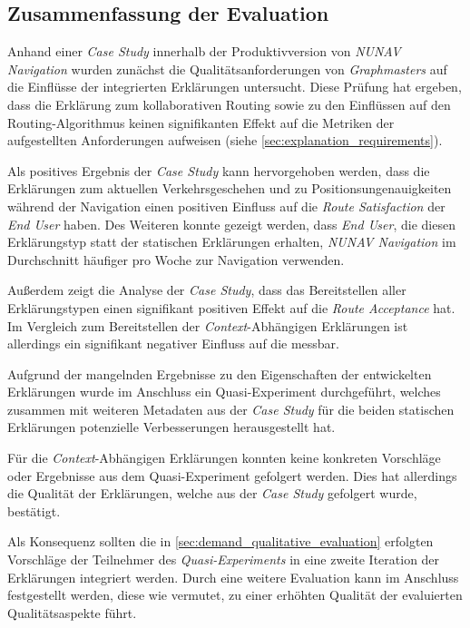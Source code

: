 \subsection{Zusammenfassung der Evaluation}

Anhand einer \textit{Case Study} innerhalb der Produktivversion von \textit{NUNAV Navigation} wurden zunächst die Qualitätsanforderungen von \textit{Graphmasters} auf die Einflüsse der integrierten Erklärungen untersucht. Diese Prüfung hat ergeben, dass die Erklärung zum kollaborativen Routing sowie zu den Einflüssen auf den Routing-Algorithmus keinen signifikanten Effekt auf die Metriken der aufgestellten Anforderungen aufweisen (siehe \autoref{sec:explanation_requirements}).

Als positives Ergebnis der \textit{Case Study} kann hervorgehoben werden, dass die Erklärungen zum aktuellen Verkehrsgeschehen und zu Positionsungenauigkeiten während der Navigation einen positiven Einfluss auf die \textit{Route Satisfaction} der \textit{End User} haben. Des Weiteren konnte gezeigt werden, dass \textit{End User}, die diesen Erklärungstyp statt der statischen Erklärungen erhalten, \textit{NUNAV Navigation} im Durchschnitt häufiger pro Woche zur Navigation verwenden.

Außerdem zeigt die Analyse der \textit{Case Study}, dass das Bereitstellen aller Erklärungstypen einen signifikant positiven Effekt auf die \textit{Route Acceptance} hat. Im Vergleich zum Bereitstellen der \textit{Context}-Abhängigen Erklärungen ist allerdings ein signifikant negativer Einfluss auf die  messbar.

Aufgrund der mangelnden Ergebnisse zu den Eigenschaften der entwickelten Erklärungen wurde im Anschluss ein Quasi-Experiment durchgeführt, welches zusammen mit weiteren Metadaten aus der \textit{Case Study} für die beiden statischen Erklärungen potenzielle Verbesserungen herausgestellt hat.

Für die \textit{Context}-Abhängigen Erklärungen konnten keine konkreten Vorschläge oder Ergebnisse aus dem Quasi-Experiment gefolgert werden. Dies hat allerdings die Qualität der Erklärungen, welche aus der \textit{Case Study} gefolgert wurde, bestätigt.

Als Konsequenz sollten die in \autoref{sec:demand_qualitative_evaluation} erfolgten Vorschläge der Teilnehmer des \textit{Quasi-Experiments} in eine zweite Iteration der Erklärungen integriert werden. Durch eine weitere Evaluation kann im Anschluss festgestellt werden, diese wie vermutet, zu einer erhöhten Qualität der evaluierten Qualitätsaspekte führt.

